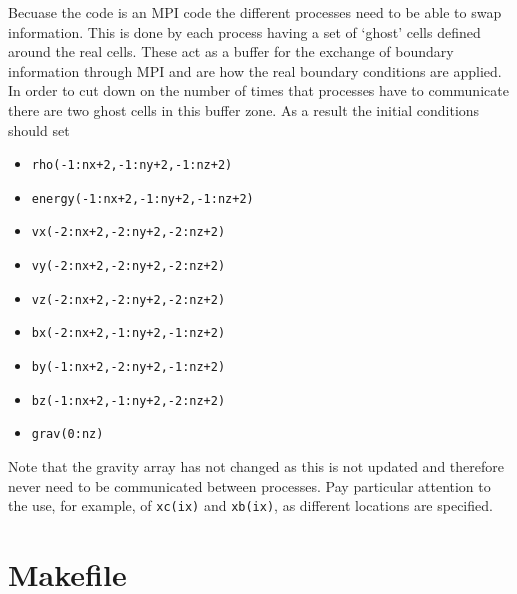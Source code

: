 \documentclass[11pt]{article}
\begin{document}
Becuase the code is an MPI code the different processes need to be able to swap information. This is done by each process having a set of `ghost' cells defined around the real cells. These act as a buffer for the exchange of boundary information through MPI and are how the real boundary conditions are applied. In order to cut down on the number of times that processes have to communicate there are two ghost cells in this buffer zone. As a result the initial conditions should set
\begin{itemize}
\item \texttt{rho(-1:nx+2,-1:ny+2,-1:nz+2)}
\item \texttt{energy(-1:nx+2,-1:ny+2,-1:nz+2)}
\item \texttt{vx(-2:nx+2,-2:ny+2,-2:nz+2)}
\item \texttt{vy(-2:nx+2,-2:ny+2,-2:nz+2)}
\item \texttt{vz(-2:nx+2,-2:ny+2,-2:nz+2)}
\item \texttt{bx(-2:nx+2,-1:ny+2,-1:nz+2)}
\item \texttt{by(-1:nx+2,-2:ny+2,-1:nz+2)}
\item \texttt{bz(-1:nx+2,-1:ny+2,-2:nz+2)}
\item \texttt{grav(0:nz)}
\end{itemize}
Note that the gravity array has not changed as this is not updated and therefore never need to be communicated between processes.  Pay particular attention to the use, for example, of \texttt{xc(ix)} and \texttt{xb(ix)}, as different locations are specified. 

\section{Makefile}
\end{document}
